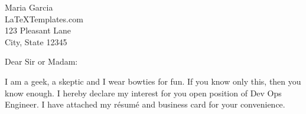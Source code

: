 \documentclass[fontsize=11pt,jphafner]{scrlttr2}
\begin{document}
\begin{letter}{Maria Garcia \\ LaTeXTemplates.com \\ 123 Pleasant Lane \\ City, State 12345} %
\opening{Dear Sir or Madam:}

\Blindtext


I am a geek, a skeptic and I wear bowties for fun.
If you know only this, then you know enough.
I hereby declare my interest for you open position of Dev Ops Engineer.
I have attached my r\'{e}sum\'{e} and business card for your convenience.

\end{letter}
\end{document}
